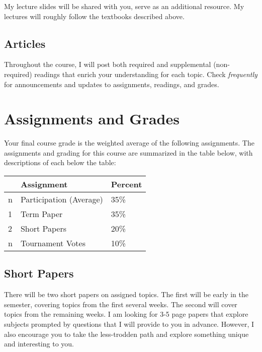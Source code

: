 \documentclass{article}
\begin{document}
My lecture slides will be shared with you, serve as an additional
resource. My lectures will roughly follow the textbooks described above.

\hypertarget{articles}{%
\subsection*{Articles}\label{articles}}

Throughout the course, I will post both required and supplemental
(non-required) readings that enrich your understanding for each topic.
Check \emph{frequently} for announcements and updates to assignments,
readings, and grades.

\hypertarget{assignments-and-grades}{%
\section*{Assignments and Grades}\label{assignments-and-grades}}

Your final course grade is the weighted average of the following
assignments. The assignments and grading for this course are summarized
in the table below, with descriptions of each below the table:

\begin{center}

\begin{tabular}{lll}
\toprule
 & Assignment & Percent\\
\midrule
n & Participation (Average) & 35\%\\
1 & Term Paper & 35\%\\
2 & Short Papers & 20\%\\
n & Tournament Votes & 10\%\\
\bottomrule
\end{tabular}
\end{center}

\hypertarget{short-papers}{%
\subsection*{Short Papers}\label{short-papers}}

There will be two short papers on assigned topics. The first will be
early in the semester, covering topics from the first several weeks. The
second will cover topics from the remaining weeks. I am looking for 3-5
page papers that explore subjects prompted by questions that I will
provide to you in advance. However, I also encourage you to take the
less-trodden path and explore something unique and interesting to you.
\end{document}
